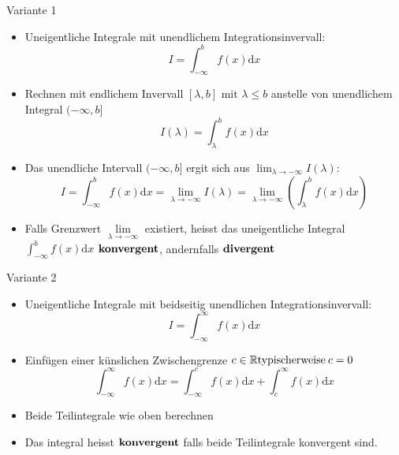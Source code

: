 \begin{KR}{Variante 1}
	\begin{itemize}
		\item Uneigentliche Integrale mit unendlichem Integrationsinvervall:
		\[I=\int_{-\infty}^b{f(x)\mathrm{d}x} \]
		\item Rechnen mit endlichem Invervall \([\lambda,b] \text{ mit } \lambda \le b \) anstelle von unendlichem
			Integral \((-\infty,b] \)
			\[I(\lambda)=\int_{\lambda}^b{f(x)\mathrm{d}x} \]
		\item Das unendliche Intervall \((-\infty,b] \) ergit sich aus \(\lim_{\lambda \rightarrow
			-\infty}I(\lambda) \):
			\[I=\int_{-\infty}^b{f(x)\mathrm{d}x}=\underset{\lambda \rightarrow -\infty}{\lim}I(\lambda)=
			\underset{\lambda \rightarrow -\infty}{\lim}\left(\int_{\lambda}^b{f(x)\mathrm{d}x}\right) \]
		\item Falls Grenzwert \(\underset{\lambda \rightarrow -\infty}{\lim}\) existiert, heisst das uneigentliche
			Integral \(\displaystyle\int_{-\infty}^b{f(x)\mathrm{d}x}\) \(\bold{konvergent}\), andernfalls 
			\(\bold{divergent}\)
	\end{itemize}
\end{KR}

\begin{KR}{Variante 2}
\begin{itemize}
	\item Uneigentliche Integrale mit beidseitig unendlichen Integrationsinvervall:
		\[I=\int_{-\infty}^{\infty}{f(x)\mathrm{d}x}\]
	\item Einfügen einer künslichen Zwischengrenze \(c \in \mathbb{R}\\\text{typischerweise}\:c=0 \)
		\[\int_{-\infty}^{\infty}{f(x)\mathrm{d}x}=\int_{-\infty}^{c}{f(x)\mathrm{d}x}+\int_c^{\infty}
		{f(x)\mathrm{d}x} \]
	\item Beide Teilintegrale wie oben berechnen
	\item Das integral heisst \(\bold{konvergent}\) falls beide Teilintegrale konvergent sind.
\end{itemize}
\end{KR}

